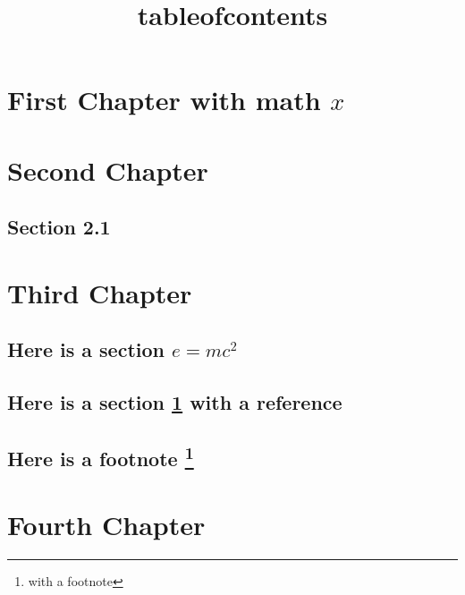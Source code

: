 \documentclass{amsbook}
\title{tableofcontents}
\begin{document}
\maketitle


\tableofcontents

\chapter{First Chapter with math $x$}
\label{chap:1}

\chapter{Second Chapter}
\label{chap:2}

\section{Section 2.1}

\chapter{Third Chapter}

\section{Here is a section $e = mc^2$}

\section{Here is a section \ref{chap:1} with a reference}

\section{Here is a footnote \protect\footnote{with a footnote}}

\chapter{Fourth Chapter}
\end{document}
